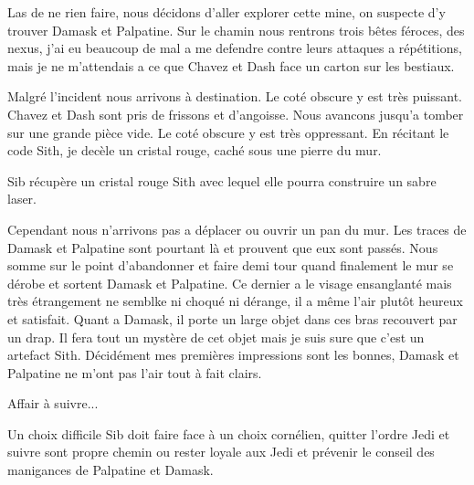 \documentclass[10pt,a4paper,twoside,twocolumn,openany]{book}
\begin{document}
Las de ne rien faire, nous décidons d'aller explorer cette mine, on suspecte
d'y trouver Damask et Palpatine. Sur le chamin nous rentrons trois bêtes féroces,
des nexus, j'ai eu beaucoup de mal a me defendre contre leurs attaques a répétitions,
mais je ne m'attendais a ce que Chavez et Dash face un carton sur les bestiaux.

Malgré l'incident nous arrivons à destination. Le coté obscure y est très puissant. 
Chavez et Dash sont pris de frissons et d'angoisse. Nous avancons jusqu'a tomber
sur une grande pièce vide. Le coté obscure y est très oppressant. En récitant
le code Sith, je decèle un cristal rouge, caché sous une pierre du mur.

\begin{quotebox}
Sib récupère un cristal rouge Sith avec lequel elle pourra construire un sabre
laser.
\end{quotebox}

Cependant nous n'arrivons pas a déplacer ou ouvrir un pan du mur.
Les traces de Damask et Palpatine sont pourtant là et prouvent que eux sont passés. 
Nous somme sur le point d'abandonner et faire demi tour quand finalement le mur se dérobe
et sortent Damask et Palpatine. Ce dernier a le visage ensanglanté mais très étrangement
ne semblke ni choqué ni dérange, il a même l'air plutôt heureux et satisfait.
Quant a Damask, il porte un large objet dans ces bras recouvert par un drap. Il fera tout
un mystère de cet objet mais je suis sure que c'est un artefact Sith. Décidément mes premières
impressions sont les bonnes, Damask et Palpatine ne m'ont pas l'air tout à fait clairs.

Affair à suivre...

\begin{paperbox}{Un choix difficile}
Sib doit faire face à un choix cornélien, quitter l'ordre Jedi et suivre sont propre
chemin ou rester loyale aux Jedi et prévenir le conseil des manigances de Palpatine et
Damask.  
\end{paperbox}
\end{document}
